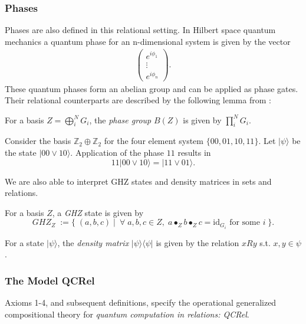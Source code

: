\subsubsection*{Phases}

Phases are also defined in this relational setting.  In Hilbert space quantum mechanics a quantum phase for an n-dimensional system is given by the vector
\begin{align*}
\left(\begin{array}{c}
e^{i\phi_1} \\
\vdots \\
e^{i\phi_n}
\end{array}
\right).
\end{align*}
These quantum phases form an abelian group and can be applied as phase gates.
Their relational counterparts are described by the following lemma from \cite{cqm-notes}:
\begin{lemma}
For a basis $Z=\bigoplus_i^NG_i$, the \emph{phase group} $B(Z)$ is given by $\prod_i^NG_i$.
\end{lemma}

\begin{example}
Consider the basis $\mathbb{Z}_2\oplus\mathbb{Z}_2$ for the four element system $\{00,01,10,11\}$.  Let $|\psi\rangle$ be the state $|00\vee10\rangle$. Application of the phase $11$ results in
\[ 11|00\vee10\rangle = |11\vee01\rangle . \]
\end{example}

We are also able to interpret GHZ states and density matrices in sets and relations.

\begin{defn}
For a basis $Z$, a \emph{GHZ} state is given by
\[ GHZ_Z \; := \{\;(a,b,c)\;|\;\ \forall \;a,b,c \in Z,\;a\bullet_Zb\bullet_Zc = \mbox{id}_{G_i}\mbox{ for some } i\;\}.  \]
\end{defn}

\begin{defn}
For a state $|\psi\rangle$, the \emph{density matrix} $|\psi\rangle\langle\psi|$ is given by the relation $xRy$ s.t. $x,y\in \psi$.
\end{defn}

\subsubsection*{The Model QCRel}

\begin{defn}
Axioms 1-4, and subsequent definitions, specify the operational generalized compositional theory for \emph{quantum computation in relations: QCRel}.
\end{defn}

